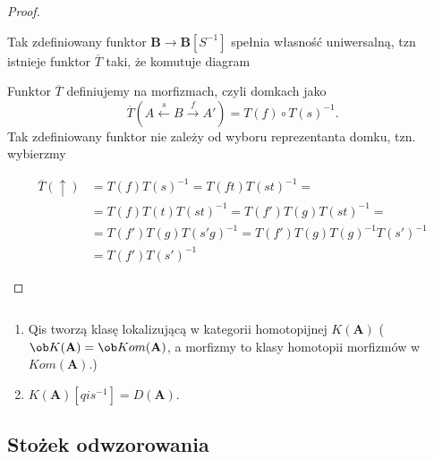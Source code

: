 \begin{proof}
\begin{enumerate}
  Tak zdefiniowany funktor $\mathbf{B}\to \mathbf{B}[S^{-1}]$ spełnia własność uniwersalną, tzn istnieje funktor $\overline{T}$ taki, że komutuje diagram
  \begin{center}\end{center}
  Funktor $\overline{T}$ definiujemy na morfizmach, czyli domkach jako
  $$
  \overline{T}(A \xleftarrow{s}B\xrightarrow{f} A') = 
  T(f)\circ T(s)^{-1}.
  $$
  Tak zdefiniowany funktor nie zależy od wyboru reprezentanta domku, tzn. wybierzmy
  \begin{center}\end{center}
  \begin{align*}
    \overline{T}(\uparrow)&=T(f)T(s)^{-1}=T(ft)T(st)^{-1}=\\ 
                          &=T(f)T(t)T(st)^{-1}=T(f')T(g)T(st)^{-1}=\\ 
                          &=T(f')T(g)T(s'g)^{-1}=T(f')T(g)T(g)^{-1}T(s')^{-1}\\ 
                          &=T(f')T(s')^{-1}
  \end{align*}
  \end{enumerate}
\end{proof}


\begin{theorem}$ $

  \begin{enumerate}
    \item Qis tworzą klasę lokalizującą w kategorii homotopijnej $K(\mathbf{A})$ ($\ob K(\mathbf{A})=\ob Kom(\mathbf{A})$, a morfizmy to klasy homotopii morfizmów w $Kom(\mathbf{A})$.)
    \item $K(\mathbf{A})[qis^{-1}]=D(\mathbf{A})$.
  \end{enumerate}
\end{theorem}

\subsection{Stożek odwzorowania}

